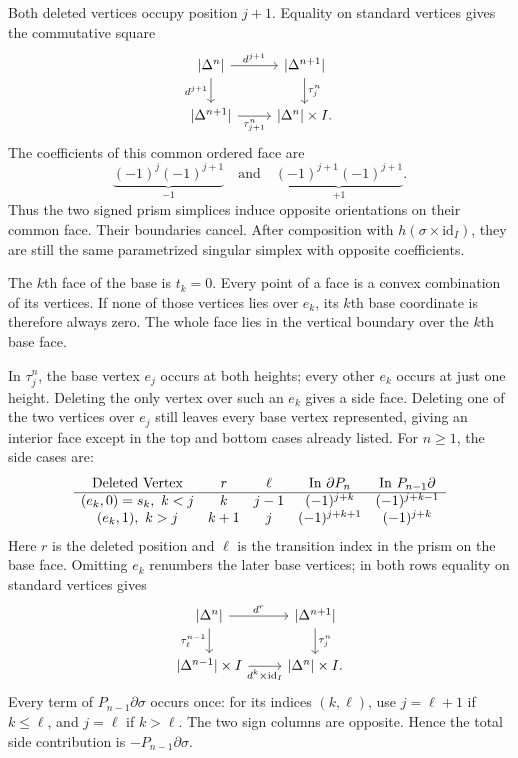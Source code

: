 \documentclass[11pt]{article}
\newcommand{\coursebold}[1]{{\color{burgundy}\textbf{#1}}}
\newcommand{\facecase}[1]{\par\Needspace{4\baselineskip}\smallskip\coursebold{#1.}\par}
\begin{document}
Both deleted vertices occupy position $j+1$. Equality on standard vertices gives the commutative square
\begin{equation*}\label{diag:interior}
\begin{tikzcd}
\lvert\Delta^n\rvert\arrow[r,"d^{j+1}"]\arrow[d,"d^{j+1}"']&
\lvert\Delta^{n+1}\rvert\arrow[d,"\tau_j^n"]\\
\lvert\Delta^{n+1}\rvert\arrow[r,"\tau_{j+1}^n"']&
\lvert\Delta^n\rvert\times I.
\end{tikzcd}
\end{equation*}
The coefficients of this common ordered face are
\[
\underbrace{(-1)^j(-1)^{j+1}}_{-1}
\quad\text{and}\quad
\underbrace{(-1)^{j+1}(-1)^{j+1}}_{+1}.
\]
Thus the two signed prism simplices induce opposite orientations on their common face. Their boundaries cancel. After composition with $h(\sigma\times\mathrm{id}_I)$, they are still the same parametrized singular simplex with opposite coefficients.

\facecase{Side Faces}
The $k$th face of the base is $t_k=0$. Every point of a face is a convex combination of its vertices. If none of those vertices lies over $e_k$, its $k$th base coordinate is therefore always zero. The whole face lies in the vertical boundary over the $k$th base face.

In $\tau_j^n$, the base vertex $e_j$ occurs at both heights; every other $e_k$ occurs at just one height. Deleting the only vertex over such an $e_k$ gives a side face. Deleting one of the two vertices over $e_j$ still leaves every base vertex represented, giving an interior face except in the top and bottom cases already listed. For $n\ge1$, the side cases are:
\[
\begin{array}{c c c c c}
\text{Deleted Vertex}&r&\ell&\text{In }\partial P_n&\text{In }P_{n-1}\partial\\\hline
(e_k,0)=s_k,\ k<j&k&j-1&(-1)^{j+k}&(-1)^{j+k-1}\\
(e_k,1),\ k>j&k+1&j&(-1)^{j+k+1}&(-1)^{j+k}
\end{array}
\]
Here $r$ is the deleted position and $\ell$ is the transition index in the prism on the base face. Omitting $e_k$ renumbers the later base vertices; in both rows equality on standard vertices gives
\begin{equation*}\label{diag:sides}
\begin{tikzcd}
\lvert\Delta^n\rvert\arrow[r,"d^r"]\arrow[d,"\tau_\ell^{n-1}"']&
\lvert\Delta^{n+1}\rvert\arrow[d,"\tau_j^n"]\\
\lvert\Delta^{n-1}\rvert\times I\arrow[r,"d^k\times\mathrm{id}_I"']&
\lvert\Delta^n\rvert\times I.
\end{tikzcd}
\end{equation*}
Every term of $P_{n-1}\partial\sigma$ occurs once: for its indices $(k,\ell)$, use $j=\ell+1$ if $k\le\ell$, and $j=\ell$ if $k>\ell$. The two sign columns are opposite. Hence the total side contribution is $-P_{n-1}\partial\sigma$.
\end{document}
